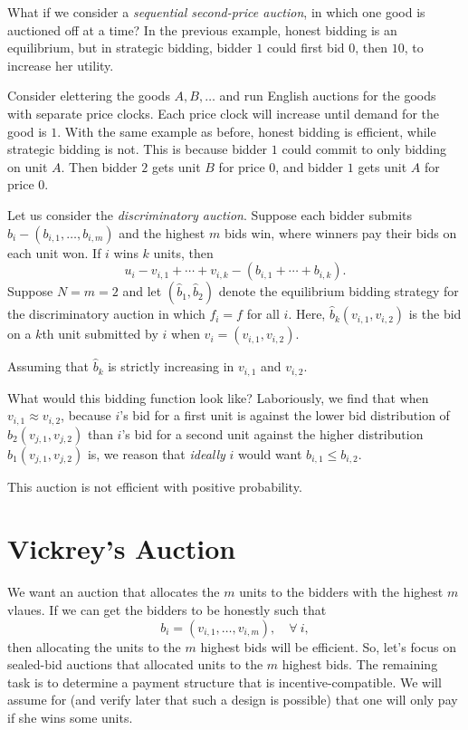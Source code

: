 What if we consider a \emph{sequential second-price auction}, in which one good is auctioned off at a time? 
In the previous example, honest bidding is an equilibrium, but in strategic bidding, bidder $1$ could first bid $0$, then $10$, to increase her utility.

Consider elettering the goods $A,B,\ldots$ and run English auctions for the goods with separate price clocks. Each price clock will increase until demand for the good is $1$. With the same example as before, honest bidding is efficient, while strategic bidding is not. This is because bidder $1$ could commit to only bidding on unit $A$. Then bidder $2$ gets unit $B$ for price $0$, and bidder $1$ gets unit $A$ for price $0$.

Let us consider the \emph{discriminatory auction}.
Suppose each bidder submits $b_i - \left( b_{i,1},\ldots,b_{i,m} \right)$ and the highest $m$ bids win, where winners pay their bids on each unit won. If $i$ wins $k$ units, then \[
	u_i - v_{i,1} + \cdots + v_{i,k} - \left( b_{i,1} + \cdots + b_{i,k} \right)
.\] 
Suppose $N=m=2$ and let $(\hat{b}_1,\hat{b}_2)$ denote the equilibrium bidding strategy for the discriminatory auction in which $f_i  =f$ for all $i$. Here, $\hat{b}_k (v_{i,1},v_{i,2})$ is the bid on a $k$th unit submitted by $i$ when $v_i= (v_{i,1},v_{i,2})$.

Assuming that $\hat{b}_k$ is strictly increasing in $v_{i,1}$ and $v_{i,2}$.

What would this bidding function look like?
Laboriously, we find that when $v_{i ,1} \approx v_{i, 2}$, because $i$'s bid for a first unit is against the lower bid distribution of $\hat{b}_2 \left( v_{j,1}, v_{j,2} \right)$ than $i$'s bid for a second unit against the higher distribution $\hat{b}_1 \left( v_{j,1},v_{j,2}\right)$ is, we reason that \emph{ideally} $i$ would want $b_{i,1} \le b_{i,2}$.  

This auction is not efficient with positive probability. 

\section{Vickrey's Auction}
We want an auction that allocates the $m$ units to the bidders with the highest $m$ vlaues. If we can get the bidders to be honestly such that \[
	b_i = \left( v_{i,1},\ldots,v_{i,m} \right), \quad \forall\ i
,\] then allocating the units to the $m$ highest bids will be efficient. So, let's focus on sealed-bid auctions that allocated units to the $m$ highest bids. The remaining task is to determine a payment structure that is incentive-compatible.
We will assume for (and verify later that such a design is possible) that one will only pay if she wins some units.

